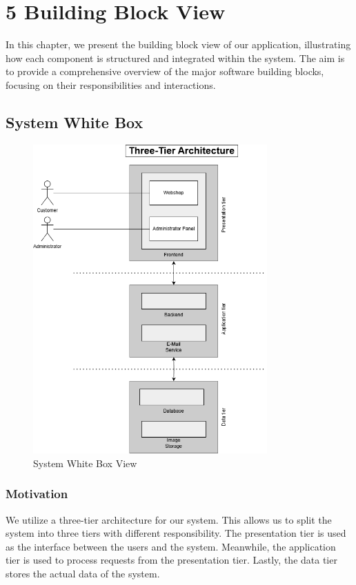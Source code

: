 \hypertarget{section-building-block-view}{%
\section{5 Building Block View}\label{section-building-block-view}}
In this chapter, we present the building block view of our application, illustrating how each component is structured and integrated within the system. The aim is to provide a comprehensive overview of the major software building blocks, focusing on their responsibilities and interactions.
\subsection{System White Box}

\begin{figure}[H]
    \centering
    \includegraphics[width=0.8\textwidth]{images/building_block_system_whitebox.png}
    \caption{System White Box View}
    \label{fig:system-whiteBox}
\end{figure}


\subsubsection{Motivation}
We utilize a three-tier architecture for our system.
This allows us to split the system into three tiers with different responsibility.
The presentation tier is used as the interface between the users and the system.
Meanwhile, the application tier is used to process requests from the presentation tier.
Lastly, the data tier stores the actual data of the system.

